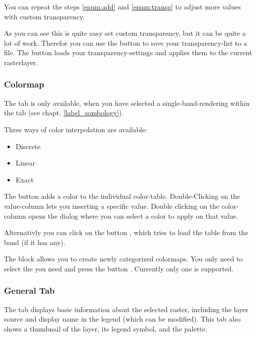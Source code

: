 You can repeat the steps \ref{enum:add} and \ref{enum:transp} to adjust
more values with custom transparency.

As you can see this is quite easy set custom transparency, but it can be
quite a lot of work. Therefor you can use the button
 to save your
transparency-list to a file. The button
 loads your
transparency-settings and applies them to the current rasterlayer.

\subsubsection{Colormap} \label{label_colormaptab}

The  tab is only available, when you have selected a
single-band-rendering within the tab  (see chapt. \ref{label_sombology}).

Three ways of color interpolation are available:
\begin{itemize}
\item Discrete
\item Linear 
\item Exact
\end{itemize}

The button  adds a color to the individual color-table.
Double-Clicking on the value-column lets you inserting a specific value.
Double clicking on the color-column opens the dialog  where you can select a color to apply on that value.

Alternativly you can click on the button
, which tries to
load the table from the band (if it has any).

The block  allows you to create newly
categorized colormaps. You only need to select the  you need and press the button . Currently
only one  is
supported.

\subsubsection{General Tab}\label{label_generaltab}

The  tab displays basic information about the selected raster,
including the layer source and  display name in the legend (which can be
modified). This tab also shows a thumbnail of the layer, its legend symbol,
and the palette.


